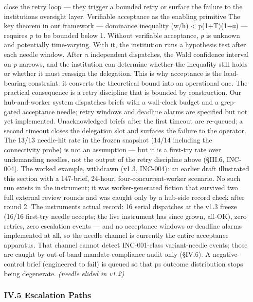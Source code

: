 \documentclass[
]{article}
\begin{document}
close the retry loop --- they trigger a bounded retry or surface the
failure to the institution\textquotesingle s oversight layer. Verifiable
acceptance as the enabling primitive The key theorem in our framework
--- dominance inequality (w/h) \textless{} p(1+T)(1−α) --- requires
\emph{p} to be bounded below 1. Without verifiable acceptance, \emph{p}
is unknown and potentially time-varying. With it, the institution runs a
hypothesis test after each needle window. After \emph{n} independent
dispatches, the Wald confidence interval on \emph{p} narrows, and the
institution can determine whether the inequality still holds or whether
it must reassign the delegation. This is why acceptance is the
load-bearing constraint: it converts the theoretical bound into an
operational one. The practical consequence is a retry discipline that is
bounded by construction. Our hub-and-worker system dispatches briefs
with a wall-clock budget and a grep-gated acceptance needle; retry
windows and deadline alarms are specified but not yet implemented.
Unacknowledged briefs after the first timeout are re-queued; a second
timeout closes the delegation slot and surfaces the failure to the
operator. The 13/13 needle-hit rate in the frozen snapshot (14/14
including the connectivity probe) is not an assumption --- but it is a
first-try rate over undemanding needles, not the output of the retry
discipline above (§III.6, INC-004). The worked example, withdrawn (v1.3,
INC-004): an earlier draft illustrated this section with a 147-brief,
24-hour, four-concurrent-worker scenario. No such run exists in the
instrument; it was worker-generated fiction that survived two full
external review rounds and was caught only by a hub-side record check
after round 2. The instrument\textquotesingle s actual record: 16 serial
dispatches at the v1.3 freeze (16/16 first-try needle accepts; the live
instrument has since grown, all-OK), zero retries, zero escalation
events --- and no acceptance windows or deadline alarms implemented at
all, so the needle channel is currently the entire acceptance apparatus.
That channel cannot detect INC-001-class variant-needle events; those
are caught by out-of-band mandate-compliance audit only (§IV.6). A
negative-control brief (engineered to fail) is queued so that
p\textquotesingle s outcome distribution stops being degenerate.
\emph{(needle elided in v1.2)}

\subsubsection{IV.5 Escalation Paths}\label{iv5-escalation-paths}
\end{document}
